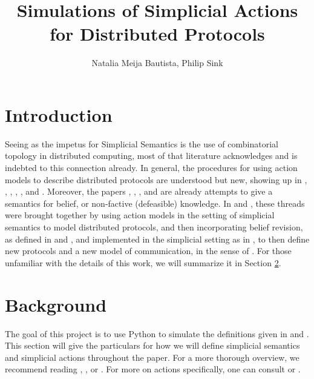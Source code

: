 \documentclass[11pt]{article}
\title{Simulations of Simplicial Actions for Distributed Protocols}
\author{Natalia Meija Bautista, Philip Sink}
\date{}
\theoremstyle{definition}
\begin{document}
	
	\maketitle
	
	\begin{abstract}
		

		
	\end{abstract}
	
	\section{Introduction} \label{sec:int}
	
	Seeing as the impetus for Simplicial Semantics is the use of combinatorial topology in distributed computing, most of that literature acknowledges and is indebted to this connection already. \cite{Death,DoA,KaSC,SimpDEL,HG,FA,DCTCT,CACHIN2025114902,Roho_2025,Lehnherr_2025} In general, the procedures for using action models to describe distributed protocols are understood but new, showing up in \cite{SimpDEL}, \cite{KaSC}, \cite{KaG}, \cite{ActionDC}, \cite{CPM}, and \cite{CPaAM}. Moreover, the papers \cite{KaSC}, \cite{BelSimp}, \cite{HGD}, and \cite{SimpBel} are already attempts to give a semantics for belief, or non-factive (defeasible) knowledge. In \cite{TechMemo} and \cite{SimpAct}, these threads were brought together by using action models in the setting of simplicial semantics to model distributed protocols, and then incorporating belief revision, as defined in \cite{Lewis2} and \cite{Stalnaker1981}, and implemented in the simplicial setting as in \cite{SimpBelRev}, to then define new protocols and a new model of communication, in the sense of \cite{TopPersp}. For those unfamiliar with the details of this work, we will summarize it in Section \ref{sec:back}.
	
	\section{Background}\label{sec:back}
	
	The goal of this project is to use Python to simulate the definitions given in \cite{TechMemo} and \cite{SimpAct}. This section will give the particulars for how we will define simplicial semantics and simplicial actions throughout the paper. For a more thorough overview, we recommend reading \cite{KaSC}, \cite{BelSimp}, or \cite{SimpBelRev}. For more on actions specifically, one can consult \cite{TechMemo} or \cite{SimpAct}.
	
\end{document}
